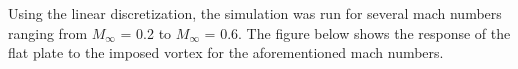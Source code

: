 \documentclass{article}
\begin{document}
\newpage
\noindent Using the linear discretization, the simulation was run for several mach numbers ranging from $M_{\infty}$ = 0.2 to  $M_{\infty}$ = 0.6. The figure below shows the response of the flat plate to the imposed vortex for the aforementioned mach numbers. 

\end{document}
